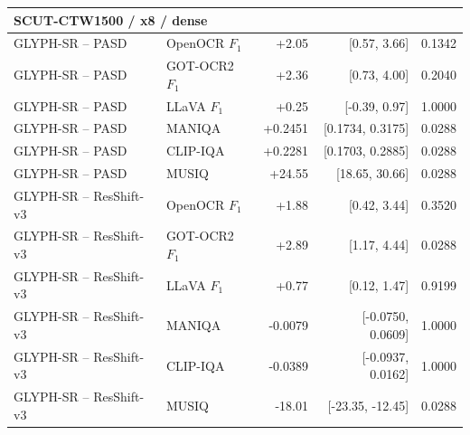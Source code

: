 \begin{longtable}{llrrr}
\midrule
\multicolumn{5}{l}{\textbf{SCUT-CTW1500 / x8 / dense}}\\
\midrule
GLYPH-SR -- PASD & OpenOCR $F_1$ & +2.05 & [0.57, 3.66] & 0.1342 \\
GLYPH-SR -- PASD & GOT-OCR2 $F_1$ & +2.36 & [0.73, 4.00] & 0.2040 \\
GLYPH-SR -- PASD & LLaVA $F_1$ & +0.25 & [-0.39, 0.97] & 1.0000 \\
GLYPH-SR -- PASD & MANIQA & +0.2451 & [0.1734, 0.3175] & 0.0288 \\
GLYPH-SR -- PASD & CLIP-IQA & +0.2281 & [0.1703, 0.2885] & 0.0288 \\
GLYPH-SR -- PASD & MUSIQ & +24.55 & [18.65, 30.66] & 0.0288 \\
GLYPH-SR -- ResShift-v3 & OpenOCR $F_1$ & +1.88 & [0.42, 3.44] & 0.3520 \\
GLYPH-SR -- ResShift-v3 & GOT-OCR2 $F_1$ & +2.89 & [1.17, 4.44] & 0.0288 \\
GLYPH-SR -- ResShift-v3 & LLaVA $F_1$ & +0.77 & [0.12, 1.47] & 0.9199 \\
GLYPH-SR -- ResShift-v3 & MANIQA & -0.0079 & [-0.0750, 0.0609] & 1.0000 \\
GLYPH-SR -- ResShift-v3 & CLIP-IQA & -0.0389 & [-0.0937, 0.0162] & 1.0000 \\
GLYPH-SR -- ResShift-v3 & MUSIQ & -18.01 & [-23.35, -12.45] & 0.0288 \\
\midrule
\end{longtable}
\endgroup
